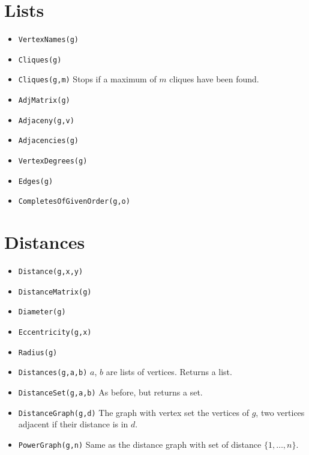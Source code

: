 \documentclass[11pt]{article}
\begin{document}
\begin{multicols}{3}
\section{Lists}
\label{sec-10}
\begin{itemize}
\item \verb~VertexNames(g)~
\item \verb~Cliques(g)~
\item \verb~Cliques(g,m)~ Stops if a maximum of \(m\) cliques have been found.
\item \verb~AdjMatrix(g)~
\item \verb~Adjaceny(g,v)~
\item \verb~Adjacencies(g)~
\item \verb~VertexDegrees(g)~
\item \verb~Edges(g)~
\item \verb~CompletesOfGivenOrder(g,o)~
\end{itemize}

\section{Distances}
\label{sec-11}
\begin{itemize}
\item \verb~Distance(g,x,y)~
\item \verb~DistanceMatrix(g)~
\item \verb~Diameter(g)~
\item \verb~Eccentricity(g,x)~ 
\item \verb~Radius(g)~
\item \verb~Distances(g,a,b)~ \(a\), \(b\) are lists of vertices. Returns a list.
\item \verb~DistanceSet(g,a,b)~ As before, but returns a set.
\item \verb~DistanceGraph(g,d)~ The graph with vertex set the vertices of
\(g\), two vertices adjacent if their distance is in \(d\).
\item \verb~PowerGraph(g,n)~ Same as the distance graph with set of distance
\(\{1,\ldots,n\}\).
\end{itemize}

\end{multicols}
\end{document}

